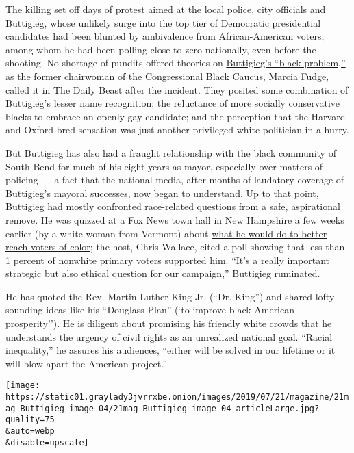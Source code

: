 The killing set off days of protest aimed at the local police, city
officials and Buttigieg, whose unlikely surge into the top tier of
Democratic presidential candidates had been blunted by ambivalence from
African-American voters, among whom he had been polling close to zero
nationally, even before the shooting. No shortage of pundits offered
theories on
\href{https://www.nytimes3xbfgragh.onion/2019/10/18/us/politics/buttigieg-laquan-mcdonald-lawyer.html}{Buttigieg's
``black problem,''} as the former chairwoman of the Congressional Black
Caucus, Marcia Fudge, called it in The Daily Beast after the incident.
They posited some combination of Buttigieg's lesser name recognition;
the reluctance of more socially conservative blacks to embrace an openly
gay candidate; and the perception that the Harvard- and Oxford-bred
sensation was just another privileged white politician in a hurry.

But Buttigieg has also had a fraught relationship with the black
community of South Bend for much of his eight years as mayor, especially
over matters of policing --- a fact that the national media, after
months of laudatory coverage of Buttigieg's mayoral successes, now began
to understand. Up to that point, Buttigieg had mostly confronted
race-related questions from a safe, aspirational remove. He was quizzed
at a Fox News town hall in New Hampshire a few weeks earlier (by a white
woman from Vermont) about \href{https://youtu.be/Y3sr0RtIfgI?t=338}{what
he would do to better reach voters of color}; the host, Chris Wallace,
cited a poll showing that less than 1 percent of nonwhite primary voters
supported him. ``It's a really important strategic but also ethical
question for our campaign,'' Buttigieg ruminated.

He has quoted the Rev. Martin Luther King Jr. (``Dr. King'') and shared
lofty-sounding ideas like his ``Douglass Plan'' (`to improve black
American prosperity''). He is diligent about promising his friendly
white crowds that he understands the urgency of civil rights as an
unrealized national goal. ``Racial inequality,'' he assures his
audiences, ``either will be solved in our lifetime or it will blow apart
the American project.''

\texttt{[image: https://static01.graylady3jvrrxbe.onion/images/2019/07/21/magazine/21mag-Buttigieg-image-04/21mag-Buttigieg-image-04-articleLarge.jpg?quality=75\\\&auto=webp\\\&disable=upscale]}

